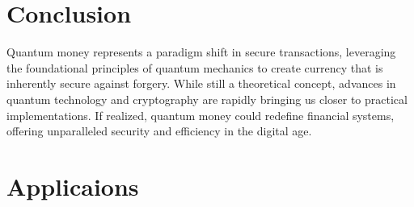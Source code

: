 \documentclass[11pt]{article}
\theoremstyle{definition}
\begin{document}
\section*{Conclusion}
Quantum money represents a paradigm shift in secure transactions, leveraging the foundational principles of quantum mechanics to create currency that is inherently secure against forgery. While still a theoretical concept, advances in quantum technology and cryptography are rapidly bringing us closer to practical implementations. If realized, quantum money could redefine financial systems, offering unparalleled security and efficiency in the digital age.




\section{Applicaions}



\end{document}
